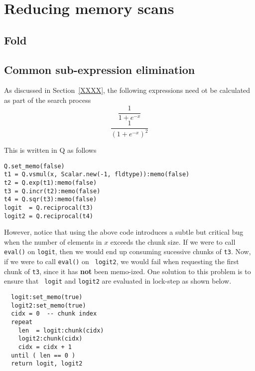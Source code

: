 \section{Reducing memory scans}

\subsection{Fold}


\subsection{Common sub-expression elimination}

As discussed in Section~\ref{XXXX}, the following expressions need ot be
calculated as part of the search process
\begin{equation}
\label{logit}
  \frac{1}{1 + e^{-x}}
\end{equation}
\begin{equation}
\label{logit2}
    \frac{1}{(1 + e^{-x})^2}
\end{equation}

This is written in Q as follows
\begin{verbatim}
Q.set_memo(false)
t1 = Q.vsmul(x, Scalar.new(-1, fldtype)):memo(false)
t2 = Q.exp(t1):memo(false)
t3 = Q.incr(t2):memo(false)
t4 = Q.sqr(t3):memo(false)
logit  = Q.reciprocal(t3)
logit2 = Q.reciprocal(t4)
\end{verbatim}

However, notice that using the above code introduces a subtle but critical bug
when the number of elements in \(x\) exceeds the chunk size.
If we were to call {\tt eval()} on {\tt logit}, then we would end up consuming
sucessive chunks of {\tt t3}. Now, if we were to call {\tt eval()} on {\tt
logit2}, we would fail when requesting the first chunk of {\tt t3}, since it has
{\bf not} been memo-ized. One solution to this problem is to ensure that {\tt
logit} and {\tt logit2} are evaluated in lock-step as shown below.
\begin{verbatim} 
  logit:set_memo(true)
  logit2:set_memo(true)
  cidx = 0  -- chunk index
  repeat 
    len  = logit:chunk(cidx)
    logit2:chunk(cidx)
    cidx = cidx + 1
  until ( len == 0 )
  return logit, logit2
\end{verbatim}

